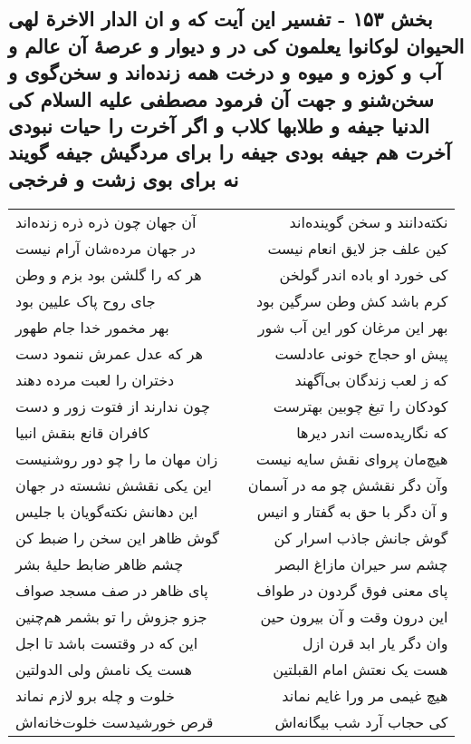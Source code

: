 \begin{center}
\section*{بخش ۱۵۳ - تفسیر این آیت که و ان الدار الاخرة لهی الحیوان لوکانوا یعلمون کی در و دیوار و عرصهٔ آن عالم و آب  و کوزه و میوه و درخت همه زنده‌اند و سخن‌گوی و سخن‌شنو و جهت آن فرمود مصطفی علیه السلام کی الدنیا جیفه و طلابها کلاب و اگر آخرت را حیات نبودی آخرت هم جیفه بودی جیفه را برای مردگیش جیفه گویند نه برای بوی زشت و فرخجی}
\label{sec:sh153}
\begin{longtable}{l p{0.5cm} r}
آن جهان چون ذره ذره زنده‌اند
&&
نکته‌دانند و سخن گوینده‌اند
\\
در جهان مرده‌شان آرام نیست
&&
کین علف جز لایق انعام نیست
\\
هر که را گلشن بود بزم و وطن
&&
کی خورد او باده اندر گولخن
\\
جای روح پاک علیین بود
&&
کرم باشد کش وطن سرگین بود
\\
بهر مخمور خدا جام طهور
&&
بهر این مرغان کور این آب شور
\\
هر که عدل عمرش ننمود دست
&&
پیش او حجاج خونی عادلست
\\
دختران را لعبت مرده دهند
&&
که ز لعب زندگان بی‌آگهند
\\
چون ندارند از فتوت زور و دست
&&
کودکان را تیغ چوبین بهترست
\\
کافران قانع بنقش انبیا
&&
که نگاریده‌ست اندر دیرها
\\
زان مهان ما را چو دور روشنیست
&&
هیچ‌مان پروای نقش سایه نیست
\\
این یکی نقشش نشسته در جهان
&&
وآن دگر نقشش چو مه در آسمان
\\
این دهانش نکته‌گویان با جلیس
&&
و آن دگر با حق به گفتار و انیس
\\
گوش ظاهر این سخن را ضبط کن
&&
گوش جانش جاذب اسرار کن
\\
چشم ظاهر ضابط حلیهٔ بشر
&&
چشم سر حیران مازاغ البصر
\\
پای ظاهر در صف مسجد صواف
&&
پای معنی فوق گردون در طواف
\\
جزو جزوش را تو بشمر هم‌چنین
&&
این درون وقت و آن بیرون حین
\\
این که در وقتست باشد تا اجل
&&
وان دگر یار ابد قرن ازل
\\
هست یک نامش ولی الدولتین
&&
هست یک نعتش امام القبلتین
\\
خلوت و چله برو لازم نماند
&&
هیچ غیمی مر ورا غایم نماند
\\
قرص خورشیدست خلوت‌خانه‌اش
&&
کی حجاب آرد شب بیگانه‌اش

\end{longtable}
\end{center}
